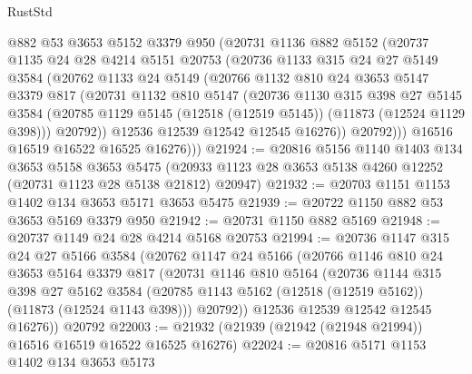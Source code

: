 \begin{lexlean}{RustStd}
\begin{coremodule}
          @882
          @53
          @3653
          @5152
          @3379
          @950
          (@20731
            @1136
            @882
            @5152
            (@20737
              @1135
              @24
              @28
              @4214
              @5151
              @20753
              (@20736
                @1133
                @315
                @24
                @27
                @5149
                @3584
                (@20762
                  @1133
                  @24
                  @5149
                  (@20766
                    @1132
                    @810
                    @24
                    @3653
                    @5147
                    @3379
                    @817
                    (@20731
                      @1132
                      @810
                      @5147
                      (@20736
                        @1130
                        @315
                        @398
                        @27
                        @5145
                        @3584
                        (@20785 @1129 @5145 (@12518 (@12519 @5145)) (@11873 (@12524 @1129 @398)))
                        @20792))
                    @12536
                    @12539
                    @12542
                    @12545
                    @16276))
                @20792)))
          @16516
          @16519
          @16522
          @16525
          @16276)))
@21924 := @20816
    @5156
    @1140
    @1403
    @134
    @3653
    @5158
    @3653
    @5475
    (@20933 @1123 @28 @3653 @5138 @4260 @12252 (@20731 @1123 @28 @5138 @21812) @20947)
@21932 := @20703 @1151 @1153 @1402 @134 @3653 @5171 @3653 @5475
@21939 := @20722 @1150 @882 @53 @3653 @5169 @3379 @950
@21942 := @20731 @1150 @882 @5169
@21948 := @20737 @1149 @24 @28 @4214 @5168 @20753
@21994 := @20736
    @1147
    @315
    @24
    @27
    @5166
    @3584
    (@20762
      @1147
      @24
      @5166
      (@20766
        @1146
        @810
        @24
        @3653
        @5164
        @3379
        @817
        (@20731
          @1146
          @810
          @5164
          (@20736
            @1144
            @315
            @398
            @27
            @5162
            @3584
            (@20785 @1143 @5162 (@12518 (@12519 @5162)) (@11873 (@12524 @1143 @398)))
            @20792))
        @12536
        @12539
        @12542
        @12545
        @16276))
    @20792
@22003 := @21932 (@21939 (@21942 (@21948 @21994)) @16516 @16519 @16522 @16525 @16276)
@22024 := @20816
    @5171
    @1153
    @1402
    @134
    @3653
    @5173

\end{coremodule}
\end{lexlean}
